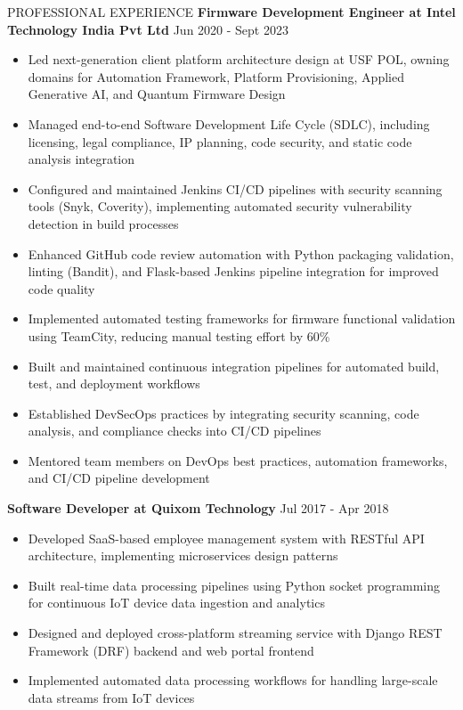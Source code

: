 \documentclass{resume} %
\begin{document}
\begin{rSection}{PROFESSIONAL EXPERIENCE}
{\textbf{Firmware Development Engineer at Intel Technology India Pvt Ltd}}  \hfill {Jun 2020 - Sept 2023}
\begin{itemize}
    \item Led next-generation client platform architecture design at USF POL, owning domains for Automation Framework, Platform Provisioning, Applied Generative AI, and Quantum Firmware Design
    \item Managed end-to-end Software Development Life Cycle (SDLC), including licensing, legal compliance, IP planning, code security, and static code analysis integration
    \item Configured and maintained Jenkins CI/CD pipelines with security scanning tools (Snyk, Coverity), implementing automated security vulnerability detection in build processes
    \item Enhanced GitHub code review automation with Python packaging validation, linting (Bandit), and Flask-based Jenkins pipeline integration for improved code quality
    \item Implemented automated testing frameworks for firmware functional validation using TeamCity, reducing manual testing effort by 60\%
    \item Built and maintained continuous integration pipelines for automated build, test, and deployment workflows
    \item Established DevSecOps practices by integrating security scanning, code analysis, and compliance checks into CI/CD pipelines
    \item Mentored team members on DevOps best practices, automation frameworks, and CI/CD pipeline development
\end{itemize}

{\textbf{Software Developer at Quixom Technology}}   \hfill {Jul 2017 - Apr 2018}
\begin{itemize}
    \item Developed SaaS-based employee management system with RESTful API architecture, implementing microservices design patterns
    \item Built real-time data processing pipelines using Python socket programming for continuous IoT device data ingestion and analytics
    \item Designed and deployed cross-platform streaming service with Django REST Framework (DRF) backend and web portal frontend
    \item Implemented automated data processing workflows for handling large-scale data streams from IoT devices
\end{itemize}


\end{rSection}
\end{document}
